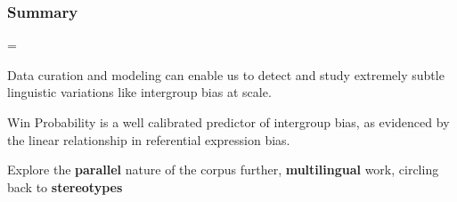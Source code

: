 \begin{frame}[c]\frametitle{Summary}
    \pause
    \begin{description}
        \itemsep=\baselineskip
        \item[Intergroup bias] Data curation and modeling can enable us to detect and study extremely subtle linguistic variations like intergroup bias at scale.\pause
        \item[Grounding] Win Probability is a well calibrated predictor of intergroup bias, as evidenced by the linear relationship in \alert{referential expression} bias.\pause
        \item[Future] Explore the \textbf{parallel} nature of the corpus further, \textbf{multilingual} work, circling back to \textbf{stereotypes}\textellipsis
    \end{description}
\end{frame}
